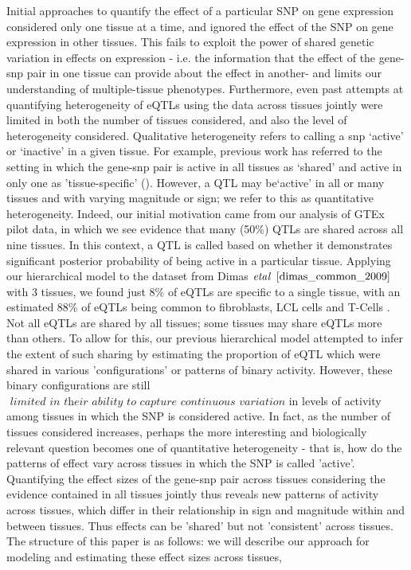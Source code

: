 Initial approaches to quantify the effect of a particular SNP on gene expression considered only one tissue at a time, and ignored the effect of the SNP on gene expression in other tissues.
This fails to exploit the power of  shared genetic variation in effects on expression - i.e. the information that the effect of the gene-snp pair in one tissue can provide about the effect in another- and limits our understanding of multiple-tissue phenotypes.
Furthermore, even past attempts at quantifying heterogeneity of eQTLs using the data across tissues jointly were limited in both the number of tissues considered, and also the level of heterogeneity considered. Qualitative heterogeneity refers to calling a snp `active' or `inactive' in a given tissue. For example, previous work has referred to the setting in which the gene-snp pair is active in all tissues as `shared' and active in only one as 'tissue-specific'  (\cite{flutre_statistical_2013,wen_bayesian_2014}).
However, a QTL may be`active' in all or many tissues and with varying magnitude or sign; we refer to this as quantitative heterogeneity.
 Indeed, our initial motivation came from our analysis of GTEx pilot data, in which we see evidence that many (50\%) QTLs are shared across all nine tissues. In this context, a QTL is called based on whether it demonstrates significant posterior probability of being active in a particular tissue. Applying our hierarchical model to the dataset from Dimas $\it{et a}l$ $\cite{dimas_common_2009}$ with 3 tissues, we found just 8\% of eQTLs are specific to a single tissue, with an estimated 88\% of eQTLs being common to fibroblasts, LCL cells and T-Cells \cite{flutre_statistical_2013}. Not all eQTLs are shared by all tissues; some tissues may share eQTLs more than others. To allow for this, our previous hierarchical model attempted to infer the extent of such sharing by estimating the proportion of eQTL which were shared in various 'configurations' or patterns of binary activity. 
 However, these binary configurations are still $\textit{ limited in their ability to capture continuous variation}$ in levels of activity among tissues in which the SNP is considered active. 
 In fact, as the number of tissues considered increases, perhaps the more interesting and biologically relevant question becomes one of quantitative heterogeneity - that is, how do the patterns of effect vary across tissues in which the SNP is called 'active'.  
Quantifying the effect sizes of the gene-snp pair across tissues considering the evidence contained in all tissues jointly thus reveals new patterns of activity across tissues, which differ in their relationship in sign and magnitude within and between tissues. Thus effects can be 'shared' but not 'consistent' across tissues. The structure of this paper is as follows: we will describe our approach for modeling and estimating these effect sizes across tissues, 
